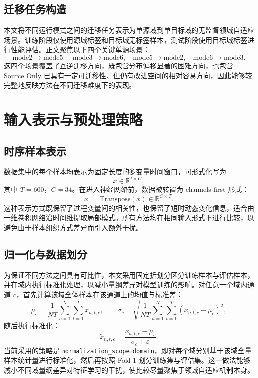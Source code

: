 \subsection{迁移任务构造}
本文将不同运行模式之间的迁移任务表示为单源域到单目标域的无监督领域自适应场景。训练阶段仅使用源域标签和目标域无标签样本，测试阶段使用目标域标签进行性能评估。正文聚焦以下四个关键单源场景：
\begin{equation}
\mathrm{mode2}\rightarrow\mathrm{mode5},\quad
\mathrm{mode3}\rightarrow\mathrm{mode6},\quad
\mathrm{mode5}\rightarrow\mathrm{mode2},\quad
\mathrm{mode6}\rightarrow\mathrm{mode3}.
\end{equation}
这四个场景覆盖了互逆迁移方向，既包含分布偏移显著的困难方向，也包含 Source Only 已具有一定可迁移性、但仍有改进空间的相对容易方向，因此能够较完整地反映方法在不同迁移难度下的表现。

\section{输入表示与预处理策略}
\subsection{时序样本表示}
数据集中的每个样本均表示为固定长度的多变量时间窗口，可形式化写为
\begin{equation}
x\in\mathbb{R}^{T\times C},
\end{equation}
其中 $T=600$，$C=34$。在进入神经网络前，数据被转置为 channels-first 形式：
\begin{equation}
x^\prime=\mathrm{Transpose}(x)\in\mathbb{R}^{C\times T}.
\end{equation}
这种表示方式既保留了过程变量间的相关性，也保留了短时动态变化信息，适合由一维卷积网络沿时间维提取局部模式。所有方法均在相同输入形式下进行比较，以避免由于样本组织方式差异而引入额外干扰。

\subsection{归一化与数据划分}
为保证不同方法之间具有可比性，本文采用固定折划分区分训练样本与评估样本，并在域内执行标准化处理，以减小量纲差异对模型训练的影响。对任意一个域内通道 $c$，首先计算该域全体样本在该通道上的均值与标准差：
\begin{equation}
\mu_c=\frac{1}{NT}\sum_{n=1}^{N}\sum_{t=1}^{T}x_{n,t,c},\qquad
\sigma_c=\sqrt{\frac{1}{NT}\sum_{n=1}^{N}\sum_{t=1}^{T}(x_{n,t,c}-\mu_c)^2},
\end{equation}
随后执行标准化：
\begin{equation}
\tilde{x}_{n,t,c}=\frac{x_{n,t,c}-\mu_c}{\sigma_c+\varepsilon}.
\end{equation}
当前采用的策略是 \texttt{normalization\_scope=domain}，即对每个域分别基于该域全量样本统计量进行标准化，然后再按照 Fold 1 划分训练集与评估集。这一做法能够减小不同域量纲差异对特征学习的干扰，使比较尽量聚焦于领域自适应机制本身。


